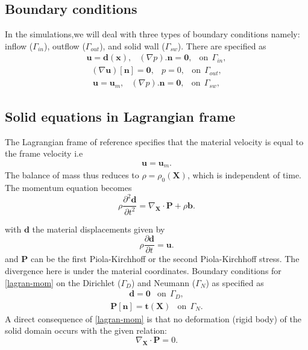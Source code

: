 \documentclass[10pt,a4paper,twoside]{article}
\begin{document}
\subsection{Boundary conditions}
In the simulations,we will deal with three types of boundary conditions namely: inflow ($\Gamma_{in}$), outflow ($\Gamma_{out}$), and solid wall ($\Gamma_{sw}$). There are specified as 
\begin{eqnarray}
	\boldsymbol{u} = \boldsymbol{d}(\boldsymbol{x}), & (\nabla p).\boldsymbol{n} = \boldsymbol{0}, & \text{on}~~ \Gamma_{in}, 
\end{eqnarray}
\begin{eqnarray}
(\nabla \boldsymbol{u})[\boldsymbol{n}] = \boldsymbol{0},  &  p = 0, & \text{on}~~ \Gamma_{out}, 
\end{eqnarray}
\begin{eqnarray}
\boldsymbol{u} = \boldsymbol{u}_m , & (\nabla p).\boldsymbol{n} = \boldsymbol{0}, & \text{on}~~ \Gamma_{sw}, 
\end{eqnarray}
\subsection{Solid equations in Lagrangian frame}
The Lagrangian frame of reference specifies that the material velocity is equal to the frame velocity i.e 
\begin{eqnarray}
\boldsymbol{u} = \boldsymbol{u}_m.
\end{eqnarray}
The balance of mass thus reduces to $\rho  = \rho_0(\boldsymbol{X})$, which is independent of time. The momentum equation becomes
\begin{equation}\label{lagran-mom}
\rho \frac{\partial^2 \boldsymbol{d}}{\partial t^2} = \nabla_{\boldsymbol{X}}\cdot \boldsymbol{P}+ \rho \boldsymbol{b}.
\end{equation}

with $\boldsymbol{d}$ the material displacements given by
\begin{equation}
\rho \frac{\partial \boldsymbol{d}}{\partial t} =  \boldsymbol{u}.
\end{equation}
and $\boldsymbol{P}$ can be the first Piola-Kirchhoff or the second Piola-Kirchhoff stress. The divergence here is under the material coordinates.
Boundary conditions for \ref{lagran-mom} on the Dirichlet ($\Gamma_D$) and Neumann ($\Gamma_N$)  as specified as 
\begin{eqnarray}
\boldsymbol{d} = \boldsymbol{0} & \text{on}~~ \Gamma_{D}, 
\end{eqnarray}
\begin{eqnarray}\label{traction}
\boldsymbol{P}[\boldsymbol{n}] = \boldsymbol{t}(\boldsymbol{X}) & \text{on}~~ \Gamma_{N}.
\end{eqnarray}
A direct consequence of \ref{lagran-mom} is that no deformation (rigid body) of the solid domain occurs with the given relation:
\begin{equation}
\nabla_{\boldsymbol{X}}\cdot \boldsymbol{P} = 0.
\end{equation}
\end{document}

